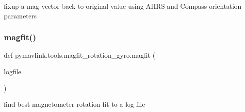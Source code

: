 \begin{DoxyVerb}fixup a mag vector back to original value using AHRS and Compass orientation parameters\end{DoxyVerb}
 \mbox{\label{namespacepymavlink_1_1tools_1_1magfit__rotation__gyro_ae8efb99d4a985344c87bdda430c85b7c}} 
\subsubsection{\texorpdfstring{magfit()}{magfit()}}
{\footnotesize\ttfamily def pymavlink.\+tools.\+magfit\+\_\+rotation\+\_\+gyro.\+magfit (\begin{DoxyParamCaption}\item[{}]{logfile }\end{DoxyParamCaption})}

\begin{DoxyVerb}find best magnetometer rotation fit to a log file\end{DoxyVerb}
 